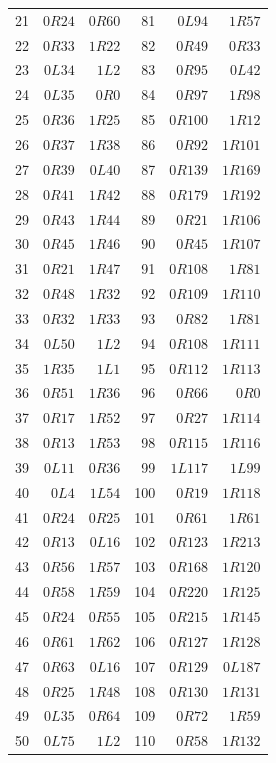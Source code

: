 \begin{center}
\begin{tabular}{@{}rrr@{\hspace{0.75in}}rrr@{}}
21 & $0R24$ & $0R60$ & 81 & $0L94$ & $1R57$\\
22 & $0R33$ & $1R22$ & 82 & $0R49$ & $0R33$\\
23 & $0L34$ & $1L2$ & 83 & $0R95$ & $0L42$\\
24 & $0L35$ & $0R0$ & 84 & $0R97$ & $1R98$\\
25 & $0R36$ & $1R25$ & 85 & $0R100$ & $1R12$\\
26 & $0R37$ & $1R38$ & 86 & $0R92$ & $1R101$\\
27 & $0R39$ & $0L40$ & 87 & $0R139$ & $1R169$\\
28 & $0R41$ & $1R42$ & 88 & $0R179$ & $1R192$\\
29 & $0R43$ & $1R44$ & 89 & $0R21$ & $1R106$\\
30 & $0R45$ & $1R46$ & 90 & $0R45$ & $1R107$\\
31 & $0R21$ & $1R47$ & 91 & $0R108$ & $1R81$\\
32 & $0R48$ & $1R32$ & 92 & $0R109$ & $1R110$\\
33 & $0R32$ & $1R33$ & 93 & $0R82$ & $1R81$\\
34 & $0L50$ & $1L2$ & 94 & $0R108$ & $1R111$\\
35 & $1R35$ & $1L1$ & 95 & $0R112$ & $1R113$\\
36 & $0R51$ & $1R36$ & 96 & $0R66$ & $0R0$\\
37 & $0R17$ & $1R52$ & 97 & $0R27$ & $1R114$\\
38 & $0R13$ & $1R53$ & 98 & $0R115$ & $1R116$\\
39 & $0L11$ & $0R36$ & 99 & $1L117$ & $1L99$\\
40 & $0L4$ & $1L54$ & 100 & $0R19$ & $1R118$\\
41 & $0R24$ & $0R25$ & 101 & $0R61$ & $1R61$\\
42 & $0R13$ & $0L16$ & 102 & $0R123$ & $1R213$\\
43 & $0R56$ & $1R57$ & 103 & $0R168$ & $1R120$\\
44 & $0R58$ & $1R59$ & 104 & $0R220$ & $1R125$\\
45 & $0R24$ & $0R55$ & 105 & $0R215$ & $1R145$\\
46 & $0R61$ & $1R62$ & 106 & $0R127$ & $1R128$\\
47 & $0R63$ & $0L16$ & 107 & $0R129$ & $0L187$\\
48 & $0R25$ & $1R48$ & 108 & $0R130$ & $1R131$\\
49 & $0L35$ & $0R64$ & 109 & $0R72$ & $1R59$\\
50 & $0L75$ & $1L2$ & 110 & $0R58$ & $1R132$\\

\end{tabular}
\end{center}
